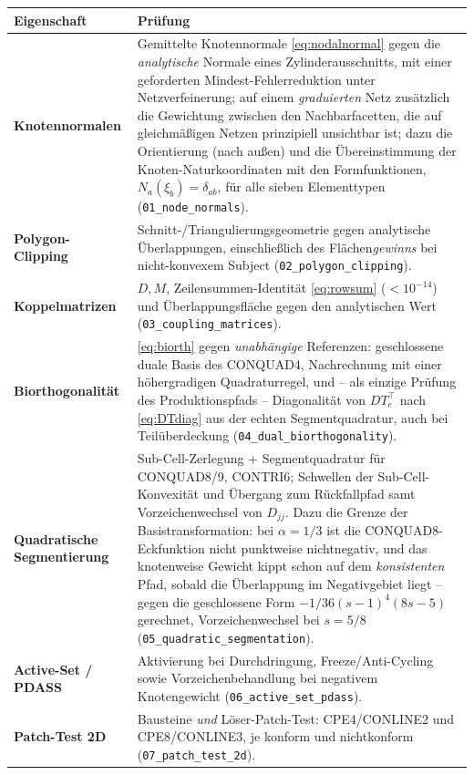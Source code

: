 \documentclass[a4paper,11pt]{article}
\def\bm#1{#1}%
\def\tfrac#1#2{#1/#2}%
\def\tilde#1{#1}%
\newcommand{\file}[1]{\texttt{\small #1}}
\begin{document}
\begin{center}
\small
\begin{tabularx}{\linewidth}{lX}
\toprule
Eigenschaft & Prüfung \\
\midrule
\textbf{Knotennormalen} & Gemittelte Knotennormale \eqref{eq:nodalnormal} gegen die \emph{analytische} Normale eines Zylinderausschnitts, mit einer geforderten Mindest-Fehlerreduktion unter Netzverfeinerung; auf einem \emph{graduierten} Netz zusätzlich die Gewichtung zwischen den Nachbarfacetten, die auf gleichmäßigen Netzen prinzipiell unsichtbar ist; dazu die Orientierung (nach außen) und die Übereinstimmung der Knoten-Naturkoordinaten mit den Formfunktionen, $N_a(\bm\xi_b)=\delta_{ab}$, für alle sieben Elementtypen (\file{01\_node\_normals}). \\
\textbf{Polygon-Clipping} & Schnitt-/Triangulierungsgeometrie gegen analytische Überlappungen, einschließlich des Flächen\emph{gewinns} bei nicht-konvexem Subject (\file{02\_polygon\_clipping}). \\
\textbf{Koppelmatrizen} & $\bm D,\bm M$, Zeilensummen-Identität \eqref{eq:rowsum} ($<10^{-14}$) und Überlappungsfläche gegen den analytischen Wert (\file{03\_coupling\_matrices}). \\
\textbf{Biorthogonalität} & \eqref{eq:biorth} gegen \emph{unabhängige} Referenzen: geschlossene duale Basis des CONQUAD4, Nachrechnung mit einer höhergradigen Quadraturregel, und -- als einzige Prüfung des Produktionspfads -- Diagonalität von $\bm D\bm T_e^{\!\top}$ nach \eqref{eq:DTdiag} aus der echten Segmentquadratur, auch bei Teilüberdeckung (\file{04\_dual\_biorthogonality}). \\
\textbf{Quadratische Segmentierung} & Sub-Cell-Zerlegung + Segmentquadratur für CONQUAD8/9, CONTRI6; Schwellen der Sub-Cell-Konvexität und Übergang zum Rückfallpfad samt Vorzeichenwechsel von $\tilde D_{jj}$. Dazu die Grenze der Basistransformation: bei $\alpha=\tfrac13$ ist die CONQUAD8-Eckfunktion nicht punktweise nichtnegativ, und das knotenweise Gewicht kippt schon auf dem \emph{konsistenten} Pfad, sobald die Überlappung im Negativgebiet liegt -- gegen die geschlossene Form $-\tfrac{1}{36}(s-1)^4(8s-5)$ gerechnet, Vorzeichenwechsel bei $s=\tfrac58$ (\file{05\_quadratic\_segmentation}). \\
\textbf{Active-Set / PDASS} & Aktivierung bei Durchdringung, Freeze/Anti-Cycling sowie Vorzeichenbehandlung bei negativem Knotengewicht (\file{06\_active\_set\_pdass}). \\
\textbf{Patch-Test 2D} & Bausteine \emph{und} Löser-Patch-Test: CPE4/CONLINE2 und CPE8/CONLINE3, je konform und nichtkonform (\file{07\_patch\_test\_2d}). \\

\end{tabularx}
\end{center}
\end{document}
